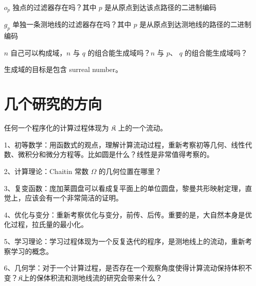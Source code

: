 \documentclass[a4paper,12pt]{article}
\begin{document}
$o_p$ 独点的过滤器存在吗？其中 $p$ 是从原点到达该点路径的二进制编码

$g_p$ 单独一条测地线的过滤器存在吗？其中 $p$ 是从原点到达测地线的路径的二进制编码

$n$ 自己可以构成域，$n$ 与 $q$ 的组合能生成域吗？$n$ 与 $p$、 $q$ 的组合能生成域吗？

生成域的目标是包含 surreal number。

\newpage

\section{几个研究的方向}

任何一个程序化的计算过程体现为 $\mathfrak{K}$ 上的一个流动。

1、初等数学：用函数式的观点，理解计算流动过程，重新考察初等几何、线性代数、微积分和微分方程等。比如圆是什么？线性是非常值得考察的。

2、计算理论：Chaitin 常数 $\Omega$ 的几何位置在哪里？

3、复变函数：庞加莱圆盘可以看成复平面上的单位圆盘，黎曼共形映射定理，直觉上，应该会有一个非常简洁的证明。

4、优化与变分：重新考察优化与变分，前传、后传。重要的是，大自然本身是优化过程，拉氏量的最小化。

5、学习理论：学习过程体现为一个反复迭代的程序，是测地线上的流动，重新考察学习的概念。

6、几何学：对于一个计算过程，是否存在一个观察角度使得计算流动保持体积不变？$\mathfrak{K}$上的保体积流和测地线流的研究会带来什么？
\end{document}
